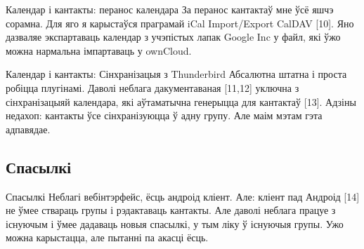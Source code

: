 \documentclass[ignorenonframetext,hyperref={pdftex,unicode}]{beamer}
\begin{document}
\begin{frame}{Календар і кантакты: перанос календара}
	За перанос кантактаў мне ўсё яшчэ сорамна. Для яго я карыстаўся праграмай iCal Import/Export CalDAV [10]. Яно дазваляе экспартаваць календар з учэпістых лапак Google Inc у файл, які ўжо можна нармальна імпартаваць у ownCloud.
\end{frame}

\begin{frame}{Календар і кантакты: Сінхранізацыя з Thunderbird}
	Абсалютна штатна і проста робіцца плугінамі. Даволі неблага дакументаваная [11,12] уключна з сінхранізацыяй календара, які аўтаматычна генерыцца для кантактаў [13]. Адзіны недахоп: кантакты ўсе сінхранізуюцца ў адну групу. Але маім мэтам гэта адпавядае.
\end{frame}

\subsection{Спасылкі}
\begin{frame}{Спасылкі}
	Неблагі вебінтэрфейс, ёсць андроід кліент. Але: кліент пад Андроід [14] не ўмее ствараць групы і рэдактаваць кантакты. Але даволі неблага працуе з існуючым і ўмее дадаваць новыя спасылкі, у тым ліку ў існуючыя групы. Ужо можна карыстацца, але пытанні па акасці ёсць.
\end{frame}
\end{document}
